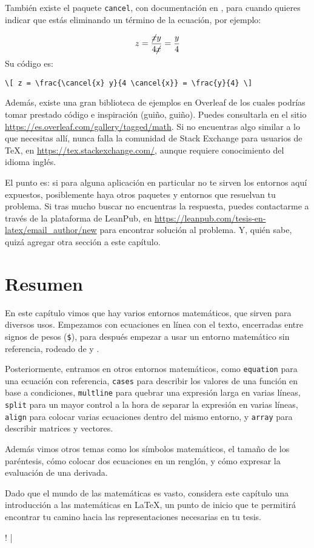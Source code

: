 También existe el paquete \texttt{cancel}, con documentación en \cite{bib:math_cancel}, para cuando quieres indicar que estás eliminando un término de la ecuación, por ejemplo:

\[ z = \frac{\cancel{x} y}{4 \cancel{x}} = \frac{y}{4} \]
\newline
Su código es:
\begin{lstlisting}[style=latex,numbers=none,mathescape=false]
\[ z = \frac{\cancel{x} y}{4 \cancel{x}} = \frac{y}{4} \]
\end{lstlisting}

Además, existe una gran biblioteca de ejemplos en Overleaf de los cuales podrías tomar prestado código e inspiración (guiño, guiño). Puedes consultarla en el sitio \href{https://es.overleaf.com/gallery/tagged/math}{https://es.overleaf.com/gallery/tagged/math}. Si no encuentras algo similar a lo que necesitas allí, nunca falla la comunidad de Stack Exchange para usuarios de \TeX{}, en \href{https://tex.stackexchange.com/}{https://tex.stackexchange.com/}, aunque requiere conocimiento del idioma inglés.

El punto es: si para alguna aplicación en particular no te sirven los entornos aquí expuestos, posiblemente haya otros paquetes y entornos que resuelvan tu problema. Si tras mucho buscar no encuentras la respuesta, puedes contactarme a través de la plataforma de LeanPub, en \href{https://leanpub.com/tesis-en-latex/email_author/new}{https://leanpub.com/tesis-en-latex/email\_author/new} para encontrar solución al problema. Y, quién sabe, quizá agregar otra sección a este capítulo.



\section*{Resumen}



En este capítulo vimos que hay varios entornos matemáticos, que sirven para diversos usos. Empezamos con ecuaciones en línea con el texto, encerradas entre signos de pesos (\texttt{\$}), para después empezar a usar un entorno matemático sin referencia, rodeado de \codigo{[} y \codigo{]}.

Posteriormente, entramos en otros entornos matemáticos, como \texttt{equation} para una ecuación con referencia, \texttt{cases} para describir los valores de una función en base a condiciones, \texttt{multline} para quebrar una expresión larga en varias líneas, \texttt{split} para un mayor control a la hora de separar la expresión en varias líneas, \texttt{align} para colocar varias ecuaciones dentro del mismo entorno, y \texttt{array} para describir matrices y vectores.

Además vimos otros temas como los símbolos matemáticos, el tamaño de los paréntesis, cómo colocar dos ecuaciones en un renglón, y cómo expresar la evaluación de una derivada.

Dado que el mundo de las matemáticas es vasto, considera este capítulo una introducción a las matemáticas en \LaTeX{}, un punto de inicio que te permitirá encontrar tu camino hacia las representaciones necesarias en tu tesis.

\lstDeleteShortInline!
\lstMakeShortInline[style=latexi]|